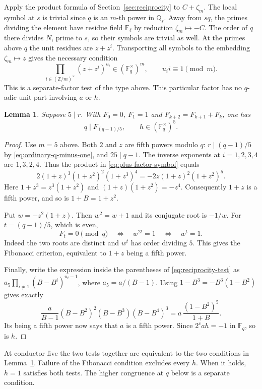 \documentclass[11pt]{article}
\newtheorem{lemma}{Lemma}
\begin{document}
Apply the product formula of Section~\ref{sec:reciprocity} to
$C+\zeta_m$. The local symbol at $s$ is trivial since $q$ is an
$m$-th power in $\mathbb Q_s$. Away from $sq$, the primes dividing
the element have residue field $\mathbb F_\ell$ by reduction
$\zeta_m\mapsto-C$. The order of $q$ there divides $N$, prime to
$s$, so their symbols are trivial as well. At the primes above $q$
the unit residues are $z+z^i$. Transporting all symbols to the
embedding $\zeta_m\mapsto z$ gives the necessary condition
\begin{equation}\label{eq:plus-factor-symbol}
 \prod_{i\in(\mathbb Z/m)^\times}(z+z^i)^{u_i}
       \in (\mathbb F_q^\times)^m,\qquad u_i i\equiv1\pmod m .
\end{equation}
This is a separate-factor test of the type above. This particular
factor has no $q$-adic unit part involving $a$ or $h$.

\begin{lemma}\label{lem:fifth-multiplier}
Suppose $5\mid r$. With $F_0=0$, $F_1=1$ and
$F_{k+2}=F_{k+1}+F_k$, one has
\[
       q\mid F_{(q-1)/5},\qquad h\in(\mathbb F_q^\times)^5.
\]
\end{lemma}
\begin{proof}
Use $m=5$ above. Both $2$ and $z$ are fifth powers modulo $q$:
$r\mid(q-1)/5$ by \eqref{eq:ordinary-q-minus-one}, and $25\mid q-1$.
The inverse exponents at $i=1,2,3,4$ are $1,3,2,4$. Thus the
product in \eqref{eq:plus-factor-symbol} equals
\[
 2(1+z)^3(1+z^2)^2(1+z^3)^4
   = -2z(1+z)^2(1+z^2)^5 .
\]
Here $1+z^3=z^3(1+z^2)$ and $(1+z)(1+z^2)=-z^4$.
Consequently $1+z$ is a fifth power, and so is $1+B=1+z^2$.

Put $w=-z^2(1+z)$. Then $w^2=w+1$ and its conjugate root is
$-1/w$. For $t=(q-1)/5$, which is even,
\[
 F_t=0\pmod q\quad\Longleftrightarrow\quad w^{2t}=1
 \quad\Longleftrightarrow\quad w^t=1 .
\]
Indeed the two roots are distinct and $w^t$ has order dividing $5$.
This gives the Fibonacci criterion, equivalent to $1+z$ being a
fifth power.

Finally, write the expression inside the parentheses of
\eqref{eq:reciprocity-test} as
$a_5\prod_{i\ne1}(B-B^i)^{u_i-1}$, where $a_5=a/(B-1)$.
Using $1-B^3=-B^3(1-B^2)$ gives exactly
\[
 \frac{a}{B-1}(B-B^2)^2(B-B^3)(B-B^4)^3
   = a\,\frac{(1-B^2)^5}{1+B}.
\]
Its being a fifth power now says that $a$ is a fifth power. Since
$2^cah=-1$ in $\mathbb F_q$, so is $h$.
\end{proof}

At conductor five the two tests together are equivalent to the two
conditions in Lemma~\ref{lem:fifth-multiplier}. Failure of the
Fibonacci condition excludes every $h$. When it holds, $h=1$
satisfies both tests. The higher congruence at $q$ below is a separate condition.
\end{document}
